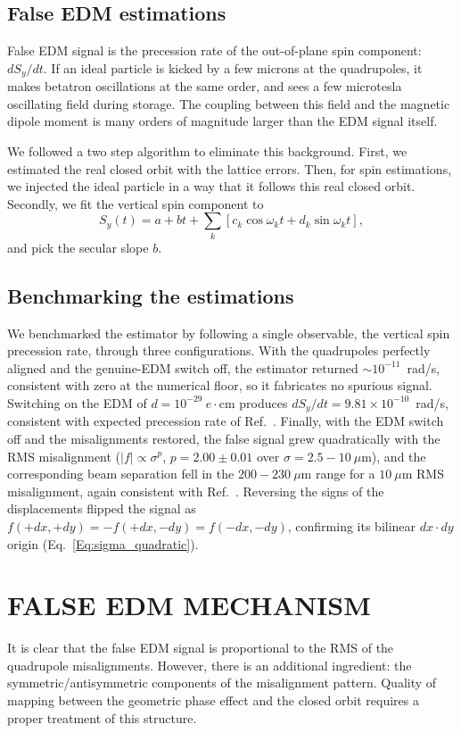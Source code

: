 \documentclass[aps,prab,reprint,superscriptaddress,nofootinbib]{revtex4-2}
\begin{document}
	\subsection{False EDM estimations}
	\label{sec:estimator}

	False EDM signal is the precession rate of the out-of-plane spin component: $dS_y/dt$. If an ideal particle is kicked by a few microns at the quadrupoles, it makes betatron oscillations at the same order, and sees a few microtesla oscillating field during storage. The coupling between this field and the magnetic dipole moment is many orders of magnitude larger than the EDM signal itself.

	We followed a two step algorithm to eliminate this background. First, we estimated the real closed orbit with the lattice errors. Then, for spin estimations, we injected the ideal particle in a way that it follows this real closed orbit. Secondly, we fit the vertical spin component to
	\begin{equation*}
		S_y(t) = a + bt + \sum_k [c_k \cos \omega_k t + d_k \sin \omega_k t],
	\end{equation*}
	and pick the secular slope $b$.

	\subsection{Benchmarking the estimations}
	\label{sec:benchmark}
	We benchmarked the estimator by following a single observable, the vertical spin precession rate, through three configurations. With the quadrupoles perfectly aligned and the genuine-EDM switch off, the estimator returned $\sim\!10^{-11}$~rad/s, consistent with zero at the numerical floor, so it fabricates no spurious signal. Switching on the EDM of $d = 10^{-29}~e \cdot$cm produces $dS_y/dt = 9.81\times10^{-10}$~rad/s, consistent with expected precession rate of Ref.~\cite{srEDM, omarov}. Finally, with the EDM switch off and the misalignments restored, the false signal grew quadratically with the RMS misalignment ($\vert f \vert \propto \sigma^p$, $p=2.00\pm0.01$ over $\sigma=2.5-10~\mu$m), and the corresponding beam separation fell in the $200-230~\mu$m range for a $10~\mu$m RMS misalignment, again consistent with Ref.~\cite{omarov}. Reversing the signs of the displacements flipped the signal as $f(+dx,+dy)=-f(+dx,-dy)=f(-dx,-dy)$, confirming its bilinear $dx\cdot dy$ origin (Eq.~\eqref{Eq:sigma_quadratic}).

	\section{FALSE EDM MECHANISM}
	\label{sec:mechanism}
	It is clear that the false EDM signal is proportional to the RMS of the quadrupole misalignments. However, there is an additional ingredient: the symmetric/antisymmetric components of the misalignment pattern. Quality of mapping between the geometric phase effect and the closed orbit requires a proper treatment of this structure.
\end{document}
